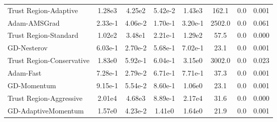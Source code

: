 \documentclass{article}
\begin{document}
\begin{table}[htbp]
{\begin{tabular}{p{2.5cm}*{7}{c}}
Trust Region-Adaptive & 1.28e3 & 4.25e2 & 5.42e-2 & 1.43e3 & 162.1 & 0.0 & 0.001 \\
Adam-AMSGrad & 2.33e-1 & 4.06e-2 & 1.70e-1 & 3.20e-1 & 2502.0 & 0.0 & 0.061 \\
Trust Region-Standard & 1.02e2 & 3.48e1 & 2.21e-1 & 1.29e2 & 57.5 & 0.0 & 0.000 \\
GD-Nesterov & 6.03e-1 & 2.70e-2 & 5.68e-1 & 7.02e-1 & 23.1 & 0.0 & 0.001 \\
Trust Region-Conservative & 1.83e0 & 5.92e-1 & 6.04e-1 & 3.15e0 & 3002.0 & 0.0 & 0.023 \\
Adam-Fast & 7.28e-1 & 2.79e-2 & 6.71e-1 & 7.71e-1 & 37.3 & 0.0 & 0.001 \\
GD-Momentum & 9.15e-1 & 5.54e-2 & 8.60e-1 & 1.06e0 & 23.1 & 0.0 & 0.001 \\
Trust Region-Aggressive & 2.01e4 & 4.68e3 & 8.89e-1 & 2.17e4 & 31.6 & 0.0 & 0.000 \\
GD-AdaptiveMomentum & 1.57e0 & 4.23e-2 & 1.41e0 & 1.64e0 & 21.9 & 0.0 & 0.001 \\
\bottomrule
\end{tabular}
}
\end{table}
\end{document}
